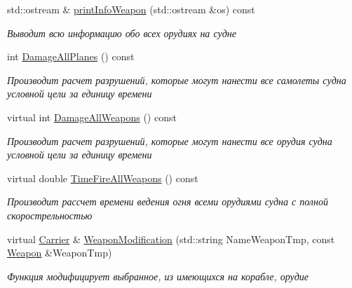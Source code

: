 \begin{DoxyCompactItemize}
std\+::ostream \& \mbox{\hyperlink{class_aircraft_carrier_group_1_1_carrier_a1b6a8d9f9d78721cc382c870aa09263a}{print\+Info\+Weapon}} (std\+::ostream \&os) const
\begin{DoxyCompactList}\small\item\em Выводит всю информацию обо всех орудиях на судне \end{DoxyCompactList}\item 
\mbox{\label{class_aircraft_carrier_group_1_1_carrier_adfaf335c1a925c8d5c0d441378cc7156}} 
int \mbox{\hyperlink{class_aircraft_carrier_group_1_1_carrier_adfaf335c1a925c8d5c0d441378cc7156}{Damage\+All\+Planes}} () const
\begin{DoxyCompactList}\small\item\em Производит расчет разрушений, которые могут нанести все самолеты судна условной цели за единицу времени \end{DoxyCompactList}\item 
virtual int \mbox{\hyperlink{class_aircraft_carrier_group_1_1_carrier_a2829f08d60294321b5d06615d696864e}{Damage\+All\+Weapons}} () const
\begin{DoxyCompactList}\small\item\em Производит расчет разрушений, которые могут нанести все орудия судна условной цели за единицу времени \end{DoxyCompactList}\item 
virtual double \mbox{\hyperlink{class_aircraft_carrier_group_1_1_carrier_aa0e7ab8690d5120c39b5eb1bb58d5709}{Time\+Fire\+All\+Weapons}} () const
\begin{DoxyCompactList}\small\item\em Производит рассчет времени ведения огня всеми орудиями судна с полной скорострельностью \end{DoxyCompactList}\item 
virtual \mbox{\hyperlink{class_aircraft_carrier_group_1_1_carrier}{Carrier}} \& \mbox{\hyperlink{class_aircraft_carrier_group_1_1_carrier_a1ed41e4f12ea2941112fa17adf8eb7a0}{Weapon\+Modification}} (std\+::string Name\+Weapon\+Tmp, const \mbox{\hyperlink{class_aircraft_carrier_group_1_1_weapon}{Weapon}} \&Weapon\+Tmp)
\begin{DoxyCompactList}\small\item\em Функция модифицирует выбранное, из имеющихся на корабле, орудие \end{DoxyCompactList}\item 

\end{DoxyCompactItemize}
